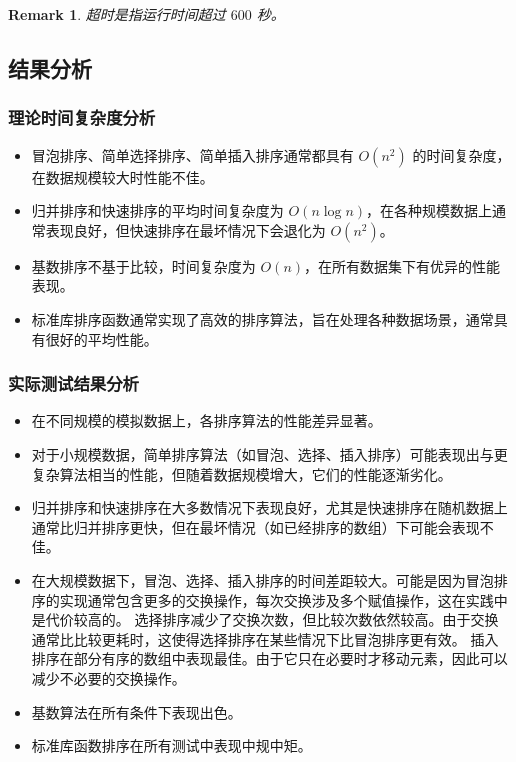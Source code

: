 \documentclass[12pt]{article}
\newtheorem{remark}{Remark}
\begin{document}
\begin{remark}
超时是指运行时间超过 $600$ 秒。
\end{remark}

\newpage

\subsection{结果分析}

\subsubsection{理论时间复杂度分析}
\begin{itemize}
    \item 冒泡排序、简单选择排序、简单插入排序通常都具有 $O(n^2)$ 的时间复杂度，在数据规模较大时性能不佳。
    \item 归并排序和快速排序的平均时间复杂度为 $O(n\log n)$，在各种规模数据上通常表现良好，但快速排序在最坏情况下会退化为 $O(n^2)$。
    \item 基数排序不基于比较，时间复杂度为 $O(n)$，在所有数据集下有优异的性能表现。
    \item 标准库排序函数通常实现了高效的排序算法，旨在处理各种数据场景，通常具有很好的平均性能。
\end{itemize}

\subsubsection{实际测试结果分析}
\begin{itemize}
    \item 在不同规模的模拟数据上，各排序算法的性能差异显著。
    \item 对于小规模数据，简单排序算法（如冒泡、选择、插入排序）可能表现出与更复杂算法相当的性能，但随着数据规模增大，它们的性能逐渐劣化。
    \item 归并排序和快速排序在大多数情况下表现良好，尤其是快速排序在随机数据上通常比归并排序更快，但在最坏情况（如已经排序的数组）下可能会表现不佳。
    \item 在大规模数据下，冒泡、选择、插入排序的时间差距较大。可能是因为冒泡排序的实现通常包含更多的交换操作，每次交换涉及多个赋值操作，这在实践中是代价较高的。
    选择排序减少了交换次数，但比较次数依然较高。由于交换通常比比较更耗时，这使得选择排序在某些情况下比冒泡排序更有效。
    插入排序在部分有序的数组中表现最佳。由于它只在必要时才移动元素，因此可以减少不必要的交换操作。
    \item 基数算法在所有条件下表现出色。
    \item 标准库函数排序在所有测试中表现中规中矩。
\end{itemize}
\end{document}
